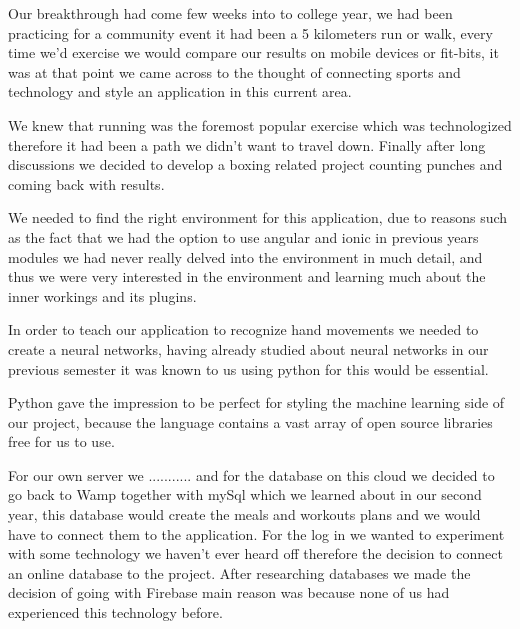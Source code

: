 \documentclass[a4paper,12pt]{report}
\begin{document}
Our breakthrough had come few weeks into to college year, we had been practicing for a community event it had been a 5 kilometers run or walk, every time we'd exercise we would compare our results on mobile devices or fit-bits, it was at that point we came across to the thought of connecting sports and technology and style an application in this current area. 

We knew that running was the foremost popular exercise which was technologized therefore it had been a path we didn't want to travel down. Finally after long discussions we decided to develop a boxing related project counting punches and coming back with results.

We needed to find the right environment for this application, due to reasons such as the fact that we had the option to use angular and ionic in previous years modules we had never really delved into the environment in much detail, and thus we were very interested in the environment and learning much about the inner workings and its plugins.

In order to teach our application to recognize hand movements we needed to create a neural networks, having already studied about neural networks in our previous semester it was known to us using python for this would be essential.

Python gave the impression to be perfect for styling the machine learning side of
our project, because the language contains a vast array of open source libraries
free for us to use.

For our own server we ........... and for the database on this cloud we decided to go back to Wamp together with mySql which we learned about in  our second year, this database would create the meals and workouts plans and we would have to connect them to the application.
For the log in we wanted to experiment with some technology we haven't ever heard off therefore the decision to connect an online database to the project. After researching databases we made the decision of going with Firebase main reason was because none of us had experienced this technology before.
\end{document}
